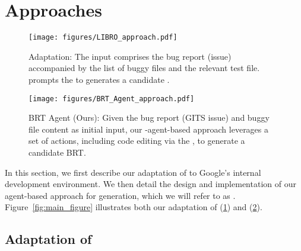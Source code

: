 \section{Approaches}
\label{sec:approach}

\begin{figure*}[htbp] %
  \centering

  \begin{subfigure}[b]{\textwidth}
    \centering
    \texttt{[image: figures/LIBRO\_approach.pdf]}
    \caption{\libro Adaptation: The input comprises the bug report (\gits issue) accompanied by the list of buggy files and the relevant test file. \libro  prompts the \codeeditingllm to generates a candidate \brt{}.}
    \label{fig:libro}
  \end{subfigure}

  \vspace{1em} %

  \begin{subfigure}[b]{\textwidth}
    \centering
    \texttt{[image: figures/BRT\_Agent\_approach.pdf]}
    \caption{BRT Agent (Ours): Given the bug report (GITS issue) and buggy file content as initial input, our \llm-agent-based approach leverages a set of actions, including code editing via the \codeeditingllm, to generate a candidate BRT.}
    \label{fig:brtagent}
  \end{subfigure}

  \caption{Bug Reproduction Test (BRT) generation techniques explored in our work.}
  \label{fig:main_figure}
\end{figure*}


In this section, we first describe our adaptation of \libro to Google's internal development environment.
We then detail the design and implementation of our agent-based approach for \brt generation, which we will refer to as \textbf{\tool}.
Figure~\ref{fig:main_figure} illustrates both our adaptation of \libro (\ref{fig:libro}) and \tool (\ref{fig:brtagent}).



\subsection{Adaptation of \libro}
\label{sec:approach:libro}



